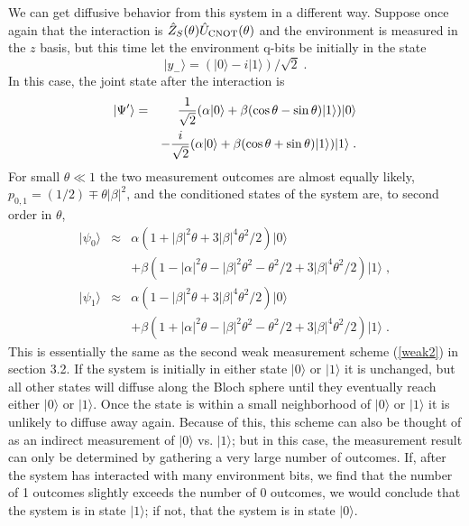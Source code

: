 \documentclass[12pt]{article}
\def\ket#1{{| #1 \rangle}}
\def\U{{\hat U}}
\def\Z{{\hat Z}}
\begin{document}
We can get diffusive behavior from this system in a different way.
Suppose once again that the interaction is
$\Z_S(\theta)\U_{\rm CNOT}(\theta)$
and the environment is measured in the $z$ basis, but this time let the
environment q-bits be initially in the state
\begin{equation}
\ket{y_-} = (\ket0 - i\ket1)/\sqrt2 \;.
\end{equation}
In this case, the joint state after the interaction is
\begin{eqnarray}
\ket{\Psi'} &=& {1\over\sqrt2}(\alpha\ket0
  + \beta(\cos\theta-\sin\theta)\ket1 ) \ket0 \nonumber\\
&& - {i\over\sqrt2}(\alpha\ket0
  + \beta(\cos\theta+\sin\theta)\ket1 ) \ket1 \;.
\end{eqnarray}
For small $\theta\ll1$ the two measurement outcomes are almost equally
likely, $p_{0,1} = (1/2) \mp \theta|\beta|^2$, and the conditioned states
of the system are, to second order in $\theta$,
\begin{eqnarray}
\ket{\psi_0} &\approx&
 \alpha(1+|\beta|^2\theta+3|\beta|^4\theta^2/2)\ket0 \nonumber\\
&& + \beta(1-|\alpha|^2\theta
 - |\beta|^2\theta^2 - \theta^2/2 + 3|\beta|^4\theta^2/2)\ket1 \;, \nonumber\\
\ket{\psi_1} &\approx&
 \alpha(1-|\beta|^2\theta+3|\beta|^4\theta^2/2)\ket0 \nonumber\\
&& + \beta(1+|\alpha|^2\theta
 - |\beta|^2\theta^2 - \theta^2/2 + 3|\beta|^4\theta^2/2)\ket1 \;.
\end{eqnarray}
This is essentially the same as
the second weak measurement scheme (\ref{weak2}) in section 3.2.
If the system is initially in either state $\ket0$ or $\ket1$ it is unchanged,
but all other states will diffuse along the Bloch sphere until they eventually
reach either $\ket0$ or $\ket1$.  Once the state is within a small
neighborhood of $\ket0$ or $\ket1$ it is unlikely to diffuse away again.
Because of this, this scheme can also be thought of as an indirect
measurement of $\ket0$ vs. $\ket1$; but in this case, the measurement
result can only be determined by gathering a very large number of outcomes.
If, after the system has interacted with many environment bits, we
find that the number of 1 outcomes slightly exceeds the number of 0 outcomes,
we would conclude that the system is in state $\ket1$; if not, that the
system is in state $\ket0$.
\end{document}
